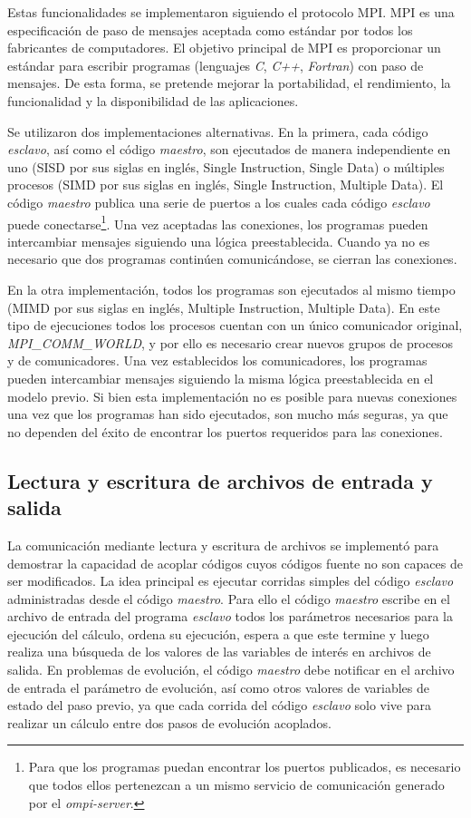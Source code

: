 Estas funcionalidades se implementaron siguiendo el protocolo MPI. 
MPI es una especificación de paso de mensajes aceptada como estándar
por todos los fabricantes de computadores. 
El objetivo principal de MPI es proporcionar un estándar para escribir
programas (lenguajes \textit{C}, \textit{C++}, \textit{Fortran}) con paso de mensajes. De esta forma, se
pretende mejorar la portabilidad, el rendimiento, la funcionalidad y
la disponibilidad de las aplicaciones.

Se utilizaron dos implementaciones alternativas.
En la primera, cada código \textit{esclavo}, así como el código \textit{maestro},
son ejecutados de manera independiente en uno (SISD por sus siglas en inglés, Single Instruction, Single Data) o múltiples procesos (SIMD por sus siglas en inglés, Single Instruction, Multiple Data).
El código \textit{maestro} publica una serie de puertos a los cuales cada código \textit{esclavo} puede conectarse\footnote{
Para que los programas puedan encontrar los puertos publicados, es necesario que todos ellos pertenezcan a un mismo servicio de comunicación generado por el \textit{ompi-server}.
}.
Una vez aceptadas las conexiones, los programas pueden intercambiar mensajes siguiendo una lógica preestablecida.
Cuando ya no es necesario que dos programas continúen comunicándose, se cierran las conexiones.

En la otra implementación, todos los programas son ejecutados al mismo tiempo (MIMD por sus siglas en inglés, Multiple Instruction, Multiple Data).
En este tipo de ejecuciones todos los procesos cuentan con un único comunicador original, \textit{MPI\_COMM\_WORLD}, y por ello es necesario crear nuevos grupos de procesos y de comunicadores.
Una vez establecidos los comunicadores, los programas pueden intercambiar mensajes siguiendo la misma lógica preestablecida en el modelo previo.
Si bien esta implementación no es posible para nuevas conexiones una vez que los programas han sido ejecutados,
son mucho más seguras, ya que no dependen del éxito de encontrar los puertos requeridos para las conexiones.

\subsection*{Lectura y escritura de archivos de entrada y salida}
\label{2:io}

La comunicación mediante lectura y escritura de archivos se implementó para demostrar la capacidad de acoplar códigos cuyos códigos fuente no son capaces de ser modificados.
La idea principal es ejecutar corridas simples del código \textit{esclavo} administradas desde el código \textit{maestro}.
Para ello el código \textit{maestro} escribe en el archivo de entrada del programa \textit{esclavo} todos los parámetros necesarios para la ejecución del cálculo,
ordena su ejecución, espera a que este termine y luego realiza una búsqueda de los valores de las variables de interés en archivos de salida.
En problemas de evolución, el código \textit{maestro} debe notificar en el archivo de entrada el parámetro de evolución,
así como otros valores de variables de estado del paso previo,
ya que cada corrida del código \textit{esclavo} solo vive para realizar un cálculo entre dos pasos de evolución acoplados.

